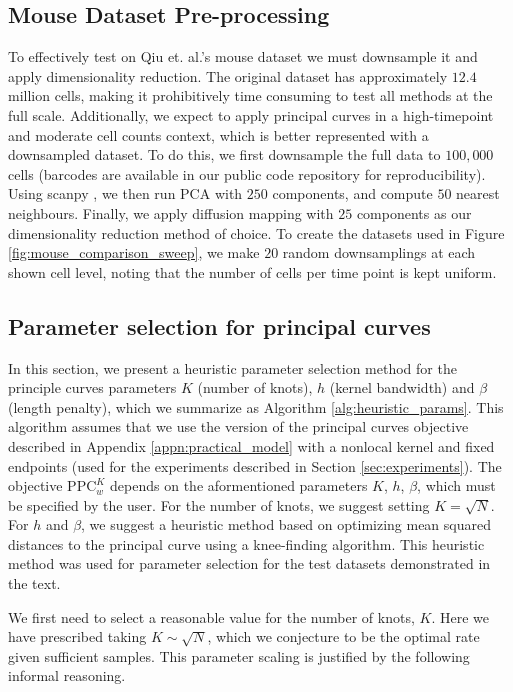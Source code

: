 \documentclass[aos, preprint]{imsart}
\theoremstyle{plain}
\theoremstyle{remark}
\begin{document}
\begin{appendix}
\subsection*{Mouse Dataset Pre-processing}
\label{appn:mouse_preprocessing}
To effectively test on Qiu et. al.'s mouse dataset \cite{mouse_time_series} we must downsample it and apply dimensionality reduction. The original dataset has approximately $12.4$ million cells, making it prohibitively time consuming to test all methods at the full scale. Additionally, we expect to apply principal curves in a high-timepoint and moderate cell counts context, which is better represented with a downsampled dataset. To do this, we first downsample the full data to $100{,}000$ cells (barcodes are available in our public code repository for reproducibility). Using scanpy \cite{scanpy}, we then run PCA with $250$ components, and compute $50$ nearest neighbours. Finally, we apply diffusion mapping with $25$ components as our dimensionality reduction method of choice. To create the datasets used in Figure \ref{fig:mouse_comparison_sweep}, we make $20$ random downsamplings at each shown cell level, noting that the number of cells per time point is kept uniform.

\subsection{Parameter selection for principal curves}
\label{appn:param_selection}
In this section, we present a heuristic parameter selection method for the principle curves parameters $K$ (number of knots), $h$ (kernel bandwidth) and $\beta$ (length penalty), which we summarize as Algorithm \ref{alg:heuristic_params}. This algorithm assumes that we use the version of the principal curves objective described in Appendix \ref{appn:practical_model} with a nonlocal kernel and fixed endpoints (used for the experiments described in Section \ref{sec:experiments}). The objective $\textrm{PPC}^K_w$ depends on the aformentioned parameters $K$, $h$, $\beta$, which must be specified by the user.  For the number of knots, we suggest setting $K = \sqrt{N}$. For $h$ and $\beta$, we suggest a heuristic method based on optimizing mean squared distances to the principal curve using a knee-finding algorithm. This heuristic method was used for parameter selection for the test datasets demonstrated in the text.

We first need to select a reasonable value for the number of knots, $K$. Here we have prescribed taking $K \sim \sqrt{N}$, which we conjecture to be  the optimal rate given sufficient samples. This parameter scaling is justified by the following informal reasoning.


\end{appendix}
\end{document}
